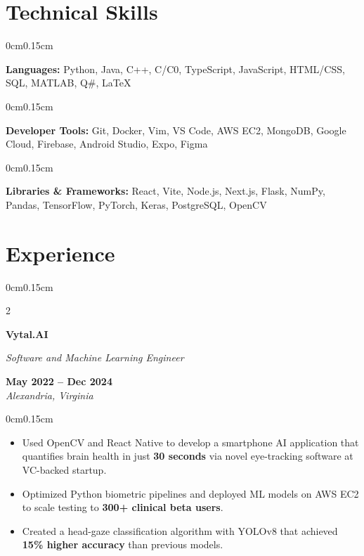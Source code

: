 \documentclass[10pt, letterpaper]{article}
\newenvironment{highlights}{
    \begin{itemize}[topsep=0pt, parsep=0pt, partopsep=0pt, itemsep=0pt, leftmargin=0.6cm]
}{
    \end{itemize}
}
\newenvironment{onecolentry}{
    \begin{adjustwidth}{0cm}{0.15cm}
}{
    \end{adjustwidth}
}
\newenvironment{twocolentry}[2][]{
    \onecolentry
    \def\secondColumn{#2}
    \setcolumnwidth{\fill, 4cm}
    \begin{paracol}{2}
}{
    \switchcolumn \raggedleft \secondColumn
    \end{paracol}
    \endonecolentry
}
\begin{document}
    \vspace{0.05cm}

    \section{Technical Skills}
    \vspace{0.1cm}

    \begin{onecolentry}
        \textbf{Languages:} Python, Java, C++, C/C0, TypeScript, JavaScript, HTML/CSS, SQL, MATLAB, Q\#, LaTeX
    \end{onecolentry}
    \vspace{-0.1cm}
    \begin{onecolentry}
        \textbf{Developer Tools:} Git, Docker, Vim, VS Code, AWS EC2, MongoDB, Google Cloud, Firebase, Android Studio, Expo, Figma
    \end{onecolentry}
    \vspace{-0.1cm}
    \begin{onecolentry}
        \textbf{Libraries \& Frameworks:} React, Vite, Node.js, Next.js, Flask, NumPy, Pandas, TensorFlow, PyTorch, Keras, PostgreSQL, OpenCV
    \end{onecolentry}

    \vspace{0.05cm}

    \section{Experience}
    \vspace{0.1cm}

    \begin{twocolentry}{\textbf{May 2022 -- Dec 2024} \\ \textit{Alexandria, Virginia}}
        \textbf{Vytal.AI}
        
        \textit{Software and Machine Learning Engineer}
    \end{twocolentry}
    \vspace{-0.05cm}
    \begin{onecolentry}
        \begin{highlights}
            \item Used OpenCV and React Native to develop a smartphone AI application that quantifies brain health in just \textbf{30 seconds} via novel eye-tracking software at VC-backed startup.
            \item Optimized Python biometric pipelines and deployed ML models on AWS EC2 to scale testing to \textbf{300+ clinical beta users}.
            \item Created a head-gaze classification algorithm with YOLOv8 that achieved \textbf{15\% higher accuracy} than previous models.
        \end{highlights}
    \end{onecolentry}
\end{document}
